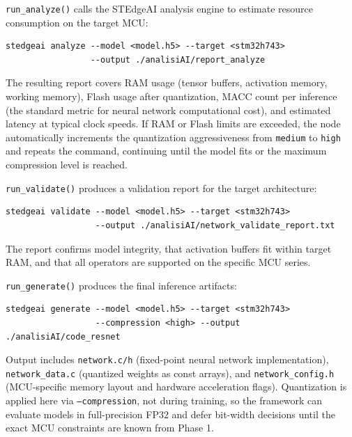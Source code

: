 \begin{description}[leftmargin=0pt, itemsep=10pt]

    \item[\textbf{Phase 1 - Model Analysis.}]
    \texttt{run\_analyze()} calls the STEdgeAI analysis engine to estimate resource consumption on the target MCU:

    \begin{verbatim}
stedgeai analyze --model <model.h5> --target <stm32h743>
                 --output ./analisiAI/report_analyze
    \end{verbatim}

    The resulting report covers RAM usage (tensor buffers, activation memory, working memory), Flash usage after quantization, MACC count per inference (the standard metric for neural network computational cost), and estimated latency at typical clock speeds. If RAM or Flash limits are exceeded, the node automatically increments the quantization aggressiveness from \texttt{medium} to \texttt{high} and repeats the command, continuing until the model fits or the maximum compression level is reached.

    \item[\textbf{Phase 2 - On-Target Validation.}]
    \texttt{run\_validate()} produces a validation report for the target architecture:

    \begin{verbatim}
stedgeai validate --model <model.h5> --target <stm32h743>
                  --output ./analisiAI/network_validate_report.txt
    \end{verbatim}

    The report confirms model integrity, that activation buffers fit within target RAM, and that all operators are supported on the specific MCU series.

    \item[\textbf{Phase 3 - C Code Generation.}]
    \texttt{run\_generate()} produces the final inference artifacts:

    \begin{verbatim}
stedgeai generate --model <model.h5> --target <stm32h743>
                  --compression <high> --output ./analisiAI/code_resnet
    \end{verbatim}

    Output includes \texttt{network.c/h} (fixed-point neural network implementation), \texttt{network\_\allowbreak data.c} (quantized weights as const arrays), and \texttt{network\_\allowbreak config.h} (MCU-specific memory layout and hardware acceleration flags). Quantization is applied here via \texttt{--compression}, not during training, so the framework can evaluate models in full-precision FP32 and defer bit-width decisions until the exact MCU constraints are known from Phase 1.

\end{description}


